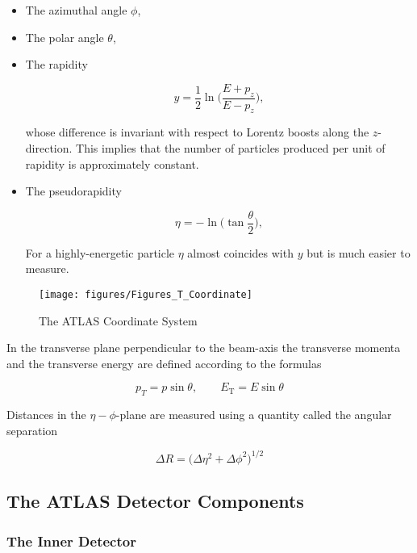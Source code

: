 \begin{itemize}
	\item The azimuthal angle $\phi$,
	\item The polar angle $\theta$,
	\item The rapidity

	      $$
		      y = \frac{1}{2}\ln\bigg( \frac{E + p_z}{E - p_z}\bigg),
	      $$

	      whose difference is invariant with respect to Lorentz boosts along the
	      $z$-direction. This implies that the number of particles produced per unit
	      of rapidity is approximately constant.

	\item The pseudorapidity

	      $$
		      \eta = -\ln\bigg( \tan \frac{\theta}{2}\bigg),
	      $$

	      For a highly-energetic particle $\eta$ almost coincides with $y$ but is much
	      easier to measure.

\end{itemize}

\begin{figure}[H]
	\texttt{[image: figures/Figures\_T\_Coordinate]}
	\centering
	\caption{The ATLAS Coordinate System~\cite{}}
	\label{f:atlasc}
\end{figure}


In the transverse plane perpendicular to the beam-axis the transverse momenta
and the transverse energy are defined according to the formulas

$$p_T = p\sin\theta, \qquad E_{\text{T}} = E\sin\theta $$

Distances in the $\eta-\phi$-plane are measured using a quantity called the
angular separation

\begin{equation}\label{eq:angulardr}
	\Delta R = \big(\Delta \eta^2 + \Delta \phi^2\big)^{1/2}
\end{equation}

\subsection{The ATLAS Detector Components}



\subsubsection{The Inner Detector}\label{s:decinner}

